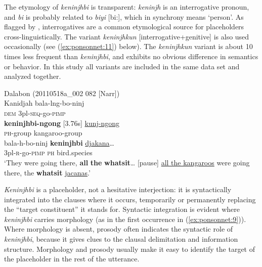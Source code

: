 \documentclass[output=paper]{langscibook}
\begin{document}
The etymology of \textit{keninjhbi} is transparent: \textit{keninjh} is an interrogative pronoun, and \textit{bi} is probably related to \textit{biyi} [bi:], which in synchrony means ‘person’. As flagged by \citet[12]{Podlesskaya2010}, interrogatives are a common etymological source for placeholders cross-linguistically. The variant \textit{keninjhkun} [interrogative+genitive] is also used occasionally (see (\ref{ex:ponsonnet:11}) below). The \textit{keninjhkun} variant is about 10 times less frequent than \textit{keninjhbi}, and exhibits no obvious difference in semantics or behavior. In this study all variants are included in the same data set and analyzed together. 

\ea
{\label{ex:ponsonnet:9} Dalabon (20110518a\_002 082 [Narr])}\\
\gll Kanidjah   bala-lng-bo-ninj\\
\textsc{dem}    3pl-\textsc{seq}{}-go-\textsc{pimp}\\
\gll \textbf{keninjhbi-ngong}    [3.76s]     \uline{kunj-ngong}    \\
\textsc{ph}-group   {}   kangaroo-group\\
\gll bala-h-bo-ninj    \textbf{keninjhbi}     \uline{djakana}…\\
3pl-\textsc{r}{}-go-\textsc{pimp}    \textsc{ph}    bird.species\\
\glt ‘They were going there, \textbf{all} \textbf{the} \textbf{whatsit}… [pause] \uline{all the kangaroos} were going there, the \textbf{whatsit} \uline{jacanas}.’\\
\z 

\textit{Keninjhbi} is a placeholder, not a hesitative interjection: it is syntactically integrated into the clauses where it occurs, temporarily or permanently replacing the “target constituent” it stands for. Syntactic integration is evident where \textit{keninjhbi} carries morphology (as in the first occurrence in (\ref{ex:ponsonnet:9})). Where morphology is absent, prosody often indicates the syntactic role of \textit{keninjhbi}, because it gives clues to the clausal delimitation and information structure. Morphology and prosody usually make it easy to identify the target of the placeholder in the rest of the utterance. 
\end{document}
